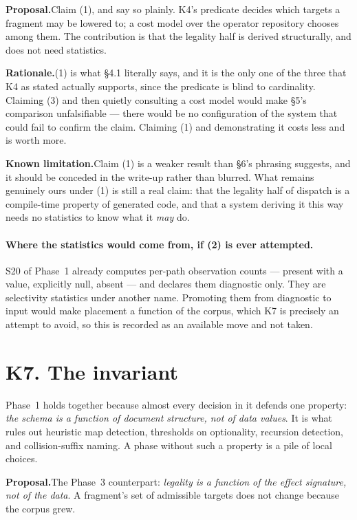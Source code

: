 \documentclass[11pt,a4paper]{article}
\newcommand{\rationale}[1]{%
  \par\noindent\textbf{Rationale.}\quad #1\par\medskip}
\newcommand{\limitation}[1]{%
  \par\noindent\textbf{Known limitation.}\quad #1\par\medskip}
\newcommand{\proposal}[1]{%
  \par\medskip\noindent\textcolor{open}{\textbf{Proposal.}}\quad #1\par\medskip}
\begin{document}
\proposal{Claim (1), and say so plainly. K4's predicate decides which targets
a fragment may be lowered to; a cost model over the operator repository chooses
among them. The contribution is that the legality half is derived
structurally, and does not need statistics.}

\rationale{(1) is what §4.1 literally says, and it is the only one of the
three that K4 as stated actually supports, since the predicate is blind to
cardinality. Claiming (3) and then quietly consulting a cost model would make
§5's comparison unfalsifiable --- there would be no configuration of the system
that could fail to confirm the claim. Claiming (1) and demonstrating it costs
less and is worth more.}

\limitation{Claim (1) is a weaker result than §6's phrasing suggests, and it
should be conceded in the write-up rather than blurred. What remains genuinely
ours under (1) is still a real claim: that the legality half of dispatch is a
compile-time property of generated code, and that a system deriving it this way
needs no statistics to know what it \emph{may} do.}

\paragraph{Where the statistics would come from, if (2) is ever attempted.}
S20 of Phase~1 already computes per-path observation counts --- present with a
value, explicitly null, absent --- and declares them diagnostic only. They are
selectivity statistics under another name. Promoting them from diagnostic to
input would make placement a function of the corpus, which K7 is precisely an
attempt to avoid, so this is recorded as an available move and not taken.

\section{K7. The invariant}

Phase~1 holds together because almost every decision in it defends one
property: \emph{the schema is a function of document structure, not of data
values}. It is what rules out heuristic map detection, thresholds on
optionality, recursion detection, and collision-suffix naming. A phase without
such a property is a pile of local choices.

\proposal{The Phase~3 counterpart: \emph{legality is a function of the effect
signature, not of the data}. A fragment's set of admissible targets does not
change because the corpus grew.}
\end{document}
